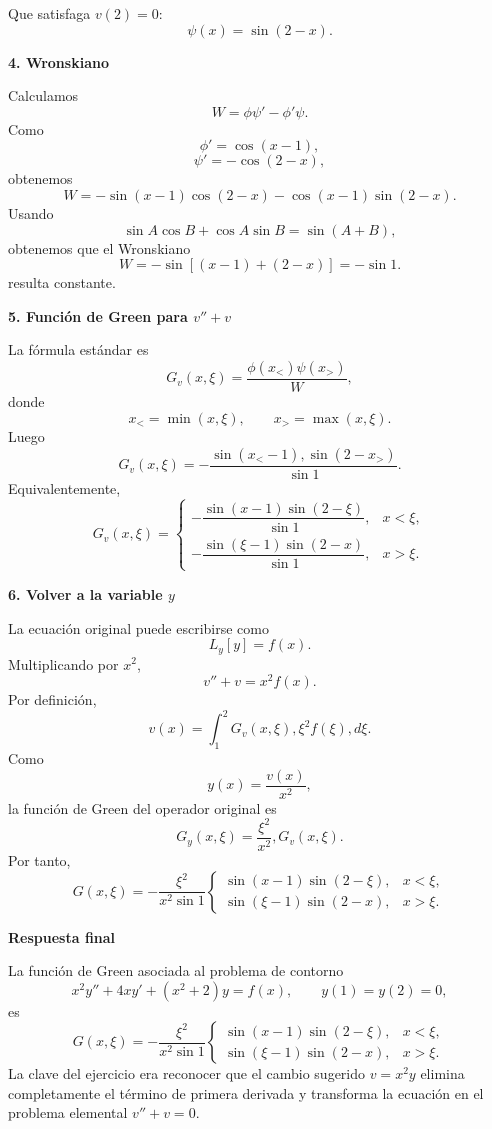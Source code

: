 \documentclass[12pt]{article}
\begin{document}
Que satisfaga $v(2)=0$:
$$
\psi(x)=\sin(2-x).
$$

{\bf 4. Wronskiano}

Calculamos
$$
W=\phi\psi'-\phi'\psi.
$$
Como
$$
\phi'=\cos(x-1),
$$
$$
\psi'=-\cos(2-x),
$$
obtenemos
$$
W
=
-\sin(x-1)\cos(2-x)
-\cos(x-1)\sin(2-x).
$$
Usando
$$
\sin A\cos B+\cos A\sin B
=
\sin(A+B),
$$
obtenemos que el Wronskiano
$$
W
=
-\sin[(x-1)+(2-x)]
=
-\sin 1.
$$
resulta constante.

{\bf 5. Función de Green para $v''+v$}

La fórmula estándar es
$$
G_v(x,\xi)
=
\frac{\phi(x_<)\psi(x_>)}{W},
$$
donde
$$
x_< = \min(x,\xi),
\qquad
x_> = \max(x,\xi).
$$
Luego
$$
\boxed{
G_v(x,\xi)
=
-\frac{
\sin(x_<-1),
\sin(2-x_>)
}{
\sin 1
}.
}
$$
Equivalentemente,
$$
G_v(x,\xi)=
\begin{cases}
-\dfrac{\sin(x-1)\sin(2-\xi)}
{\sin1},
& x<\xi,
\\
-\dfrac{\sin(\xi-1)\sin(2-x)}
{\sin1},
& x>\xi.
\end{cases}
$$

{\bf 6. Volver a la variable $y$}

La ecuación original puede escribirse como
$$
L_y[y]=f(x).
$$
Multiplicando por $x^2$,
$$
v''+v=x^2f(x).
$$
Por definición,
$$
v(x)
=
\int_1^2
G_v(x,\xi),
\xi^2f(\xi),
d\xi.
$$
Como
$$
y(x)=\frac{v(x)}{x^2},
$$
la función de Green del operador original es
$$
G_y(x,\xi)
=
\frac{\xi^2}{x^2}
,G_v(x,\xi).
$$
Por tanto,
$$
\boxed{
G(x,\xi)
=
-\frac{\xi^2}{x^2\sin1}
\begin{cases}
\sin(x-1)\sin(2-\xi),
&
x<\xi,
\\
\sin(\xi-1)\sin(2-x),
&
x>\xi.
\end{cases}
}
$$

{\bf Respuesta final}

La función de Green asociada al problema de contorno
$$
x^2y''+4xy'+(x^2+2)y=f(x),
\qquad
y(1)=y(2)=0,
$$
es
$$
\boxed{
G(x,\xi)
=
-\frac{\xi^2}{x^2\sin1}
\begin{cases}
\sin(x-1)\sin(2-\xi), & x<\xi,\\
\sin(\xi-1)\sin(2-x), & x>\xi.
\end{cases}
}
$$
La clave del ejercicio era reconocer que el cambio sugerido $v=x^2y$ elimina completamente el término de primera derivada y transforma la ecuación en el problema elemental $v''+v=0$.
\end{document}
